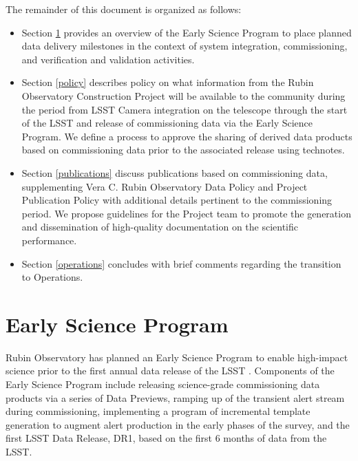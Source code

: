 \documentclass[SE,authoryear,toc,lsstdraft]{lsstdoc}
\begin{document}
The remainder of this document is organized as follows:

\begin{itemize}

  \item Section \ref{early_science} provides an overview of the Early Science Program to place planned data delivery milestones in the context of system integration, commissioning, and verification and validation activities.

  \item Section \ref{policy} describes policy on what information from the Rubin Observatory Construction Project will be available to the community during the period from LSST Camera integration on the telescope through the start of the LSST and release of commissioning data via the Early Science Program.
  We define a process to approve the sharing of derived data products based on commissioning data prior to the associated release using technotes.

  \item Section \ref{publications} discuss publications based on commissioning data, supplementing Vera C. Rubin Observatory Data Policy  and Project Publication Policy \citep{LPM-162} with additional details pertinent to the commissioning period.
  We propose guidelines for the Project team to promote the generation and dissemination of high-quality documentation on the scientific performance.

  \item Section \ref{operations} concludes with brief comments regarding the transition to Operations.

\end{itemize}

\section{Early Science Program}
\label{early_science}

Rubin Observatory has planned an Early Science Program to enable high-impact science prior to the first annual data release of the LSST .
Components of the Early Science Program include releasing science-grade commissioning data products via a series of Data Previews, ramping up of the transient alert stream during commissioning, implementing a program of incremental template generation to augment alert production in the early phases of the survey, and the first LSST Data Release, DR1, based on the first 6 months of data from the LSST.
\end{document}
